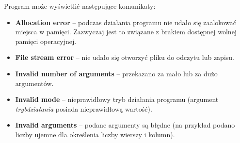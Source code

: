 \documentclass{article}
\begin{document}
\noindent Program może wyświetlić następujące komunikaty:
\begin{itemize}
    \item \textbf{Allocation error} -- podczas działania programu nie udało się zaalokować miejsca w pamięci. Zazwyczaj jest to związane z brakiem dostępnej wolnej pamięci operacyjnej.
    \item \textbf{File stream error} -- nie udało się otworzyć pliku do odczytu lub zapisu.
    \item \textbf{Invalid number of arguments} -- przekazano za mało lub za dużo argumentów.
    \item \textbf{Invalid mode} -- nieprawidłowy tryb działania programu (argument \emph{tryb\textunderscore działania} posiada nieprawidłową wartość).
    \item \textbf{Invalid arguments} -- podane argumenty są błędne (na przykład podano liczby ujemne dla określenia liczby wierszy i kolumn).
\end{itemize}
\end{document}

